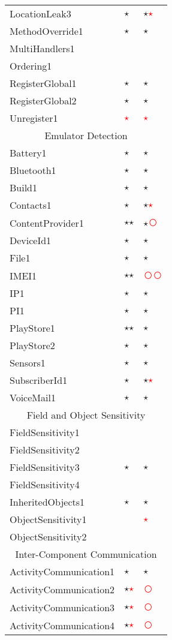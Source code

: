 \documentclass[../draft.tex]{subfiles}
\newcommand{\fp}{\textcolor{white}{\textcircled{\textcolor{red}{$\star$}}}}
\newcommand{\fn}{\textcolor{red}{\textcircled{ }}}
\newcommand{\tp}[0]{\textcircled{$\star$}}
\newcommand{\tsub}[1]{\multicolumn{3}{c}{#1}\\\hline}
\begin{document}
\begin{longtable}{l | l | l}
        LocationLeak3 & \tp & \tp \fp\\
        MethodOverride1 & \tp & \tp\\
        MultiHandlers1 & & \\
        Ordering1 & & \\
        RegisterGlobal1 & \tp & \tp\\
        RegisterGlobal2 & \tp & \tp\\
        Unregister1 & \fp & \fp\\
        \hline
        \tsub{Emulator Detection}
        Battery1 & \tp & \tp\\
        Bluetooth1 & \tp & \tp\\
        Build1 & \tp & \tp\\
        Contacts1 & \tp & \tp \fp\\
        ContentProvider1 & \tp \tp & \tp \fn\\
        DeviceId1 & \tp & \tp\\
        File1 & \tp & \tp\\
        IMEI1 & \tp \tp & \fn \fn\\
        IP1 & \tp & \tp\\
        PI1 & \tp & \tp\\
        PlayStore1 & \tp \tp & \tp\\
        PlayStore2 & \tp & \tp\\
        Sensors1 & \tp & \tp\\
        SubscriberId1 & \tp & \tp \fp\\
        VoiceMail1 & \tp & \tp\\
        \hline
        \tsub{Field and Object Sensitivity}
        FieldSensitivity1 & & \\
        FieldSensitivity2 & & \\
        FieldSensitivity3 & \tp & \tp\\
        FieldSensitivity4 & & \\
        InheritedObjects1 & \tp & \tp\\
        ObjectSensitivity1 & & \fp\\
        ObjectSensitivity2 & & \\
        \hline
        \tsub{Inter-Component Communication}
        ActivityCommunication1 & \tp & \tp\\
        ActivityCommunication2 & \tp \fp & \fn\\
        ActivityCommunication3 & \tp \fp & \fn\\
        ActivityCommunication4 & \tp \fp & \fn\\

\end{longtable}
\end{document}
